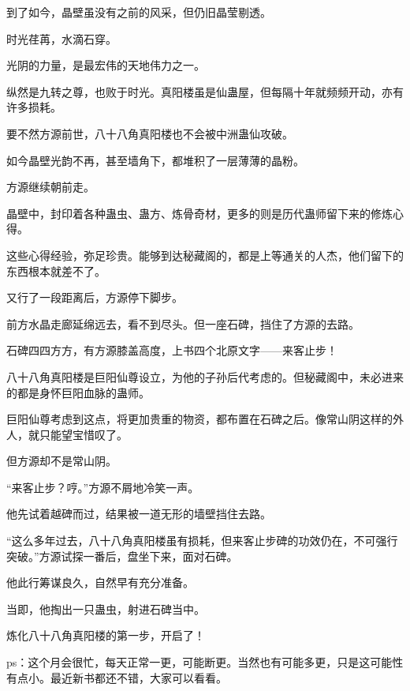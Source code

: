 \begin{this_body}
到了如今，晶壁虽没有之前的风采，但仍旧晶莹剔透。

时光荏苒，水滴石穿。

光阴的力量，是最宏伟的天地伟力之一。

纵然是九转之尊，也败于时光。真阳楼虽是仙蛊屋，但每隔十年就频频开动，亦有许多损耗。

要不然方源前世，八十八角真阳楼也不会被中洲蛊仙攻破。

如今晶壁光韵不再，甚至墙角下，都堆积了一层薄薄的晶粉。

方源继续朝前走。

晶壁中，封印着各种蛊虫、蛊方、炼骨奇材，更多的则是历代蛊师留下来的修炼心得。

这些心得经验，弥足珍贵。能够到达秘藏阁的，都是上等通关的人杰，他们留下的东西根本就差不了。

又行了一段距离后，方源停下脚步。

前方水晶走廊延绵远去，看不到尽头。但一座石碑，挡住了方源的去路。

石碑四四方方，有方源膝盖高度，上书四个北原文字——来客止步！

八十八角真阳楼是巨阳仙尊设立，为他的子孙后代考虑的。但秘藏阁中，未必进来的都是身怀巨阳血脉的蛊师。

巨阳仙尊考虑到这点，将更加贵重的物资，都布置在石碑之后。像常山阴这样的外人，就只能望宝惜叹了。

但方源却不是常山阴。

“来客止步？哼。”方源不屑地冷笑一声。

他先试着越碑而过，结果被一道无形的墙壁挡住去路。

“这么多年过去，八十八角真阳楼虽有损耗，但来客止步碑的功效仍在，不可强行突破。”方源试探一番后，盘坐下来，面对石碑。

他此行筹谋良久，自然早有充分准备。

当即，他掏出一只蛊虫，射进石碑当中。

炼化八十八角真阳楼的第一步，开启了！

ps：这个月会很忙，每天正常一更，可能断更。当然也有可能多更，只是这可能性有点小。最近新书都还不错，大家可以看看。

\end{this_body}

